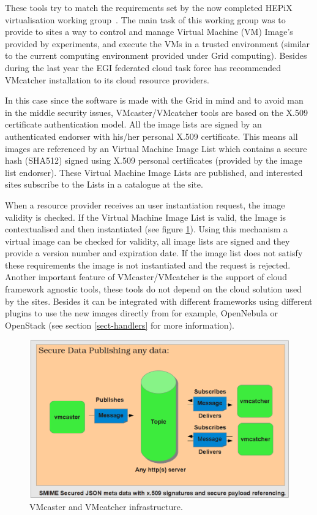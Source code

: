 \documentclass[oribibl]{llncs_Ibergrid2013}
\begin{document}
These tools try to match the requirements set by the now completed HEPiX virtualisation working group~\cite{hepix}.
The main task of this working group was to provide to sites a way to control and manage Virtual Machine (VM) Image's provided by experiments, and execute the VMs in a trusted environment (similar to the current computing environment provided under Grid computing).
Besides during the last year the EGI federated cloud task force has recommended VMcatcher installation to its cloud resource providers.

In this case since the software is made with the Grid in mind and to avoid man in the middle security issues, VMcaster/VMcatcher tools are based on the X.509 certificate authentication model.
All the image lists are signed by an authenticated endorser with his/her personal X.509 certificate. 
This means all images are referenced by an Virtual Machine Image List which contains a secure hash (SHA512) signed using X.509 personal certificates (provided by the image list endorser). 
These Virtual Machine Image Lists are published, and interested sites subscribe to the Lists in a catalogue at the site. 

When a resource provider receives an user instantiation request, the image validity is checked. If the Virtual Machine Image List is valid, the Image is contextualised and then instantiated (see figure \ref{fig:infrastructure}). 
Using this mechanism a virtual image can be checked for validity, all image lists are signed and they provide a version number and expiration date. If the image list does not satisfy these requirements the image is not instantiated and the request is rejected.
Another important feature of VMcaster/VMcatcher is the support of cloud framework agnostic tools, these tools do not depend on the cloud solution used by the sites. Besides it can be integrated with different frameworks using different plugins to use the new images directly from for example, OpenNebula or OpenStack (see section \ref{sect-handlers} for more information).

\begin{figure}[h]
\centering
\includegraphics[width=1\textwidth]{vmcaster_vmcatcher.png}
\caption{VMcaster and VMcatcher infrastructure.}
\label{fig:infrastructure}
\end{figure}
\end{document}
